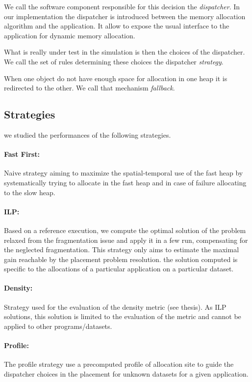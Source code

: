 \documentclass[10 pt]{article}
\begin{document}
We call the software component responsible for this decision the \emph{dispatcher}. In our implementation the dispatcher is introduced between the memory allocation algorithm and the application.
It allow to expose the usual interface to the application for dynamic memory allocation.

What is really under test in the simulation is then the choices of the dispatcher. We call the set of rules determining these choices the dispatcher \emph{strategy}.

When one object do not have enough space for allocation in one heap it is redirected to the other.
We call that mechanism \emph{fallback}.


\subsection{Strategies}
we studied the performances of the following strategies.

\paragraph{Fast First:} Naive strategy aiming to maximize the spatial-temporal use of the fast heap by systematically trying to allocate in the fast heap and in case of failure allocating to the slow heap.
\paragraph{ILP:} Based on a reference execution, we compute the optimal solution of the problem relaxed from the fragmentation issue and apply it in a few run, compensating for the neglected fragmentation. This strategy only aims to estimate the maximal gain reachable by the placement problem resolution. the solution computed is specific to the allocations of a particular application on a particular dataset.
\paragraph{Density:} Strategy used for the evaluation of the density metric (see thesis). As ILP solutions, this solution is limited to the evaluation of the metric and cannot be applied to other programs/datasets.
\paragraph{Profile:} The profile strategy use a precomputed profile of allocation site to guide the dispatcher choices in the placement for unknown datasets for a given application.
\end{document}
